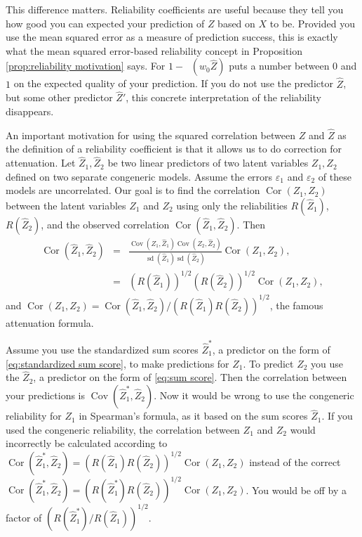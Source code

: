 \documentclass[twoside]{article}
\DeclareMathOperator{\sd}{sd}
\DeclareMathOperator{\Cor}{Cor}
\DeclareMathOperator{\Cov}{Cov}
\DeclareMathOperator{\MSE}{MSE_Z}
\renewcommand{\sqrt}[1]{{(#1)^{1/2}}}
\begin{document}
This difference matters. Reliability coefficients are useful because they tell you how good you can expected your prediction of $Z$ based on $X$ to be. Provided you use the mean squared error as a measure of prediction success, this is exactly what the mean squared error-based reliability concept in Proposition \ref{prop:reliability motivation} says. For $1 - \MSE(w_0\hat{Z})$ puts a number between $0$ and $1$ on the expected quality of your prediction. If you do not use the predictor $\hat{Z}$, but some other predictor $\hat{Z}'$, this concrete interpretation of the reliability disappears. 

An important motivation for using the squared
correlation between $Z$ and $\hat{Z}$ as the definition of a
reliability coefficient is that it allows us to do correction for
attenuation. Let $\hat{Z}_{1},\hat{Z}_{2}$ be two linear
predictors of two latent variables $Z_{1},Z_{2}$ defined on two separate
congeneric models. Assume the errors $\varepsilon_{1}$ and $\varepsilon_{2}$ of these models
are uncorrelated. Our goal is to find the correlation $\Cor(Z_{1},Z_{2})$
between the latent variables $Z_{1}$ and $Z_{2}$ using only the
reliabilities $ R(\hat{Z}_{1})$, $ R(\hat{Z}_{2})$,
and the observed correlation $\Cor(\hat{Z}_{1},\hat{Z}_{2})$.
Then
\begin{eqnarray*}
\Cor(\hat{Z}_{1},\hat{Z}_{2}) & = & \frac{\Cov(Z_{1},\hat{Z}_{1})\Cov(Z_{2},\hat{Z}_{2})}{\sd(\hat{Z}_{1})\sd(\hat{Z}_{2})}\Cor(Z_{1},Z_{2}),\\
 & = & \sqrt{ R(\hat{Z}_{1})}\sqrt{ R(\hat{Z}_{2})}\Cor(Z_{1},Z_{2}),
\end{eqnarray*}
and $\Cor(Z_{1},Z_{2})=\Cor(\hat{Z}_{1},\hat{Z}_{2})/\sqrt{ R(\hat{Z}_{1}) R(\hat{Z}_{2})}$,
the famous \citet{spearman1904proof} attenuation formula.


Assume you use the standardized sum scores $\hat{Z}_1^*$, a predictor on the form of  \cref{eq:standardized sum score}, to make predictions for $Z_1$. To predict $Z_2$ you use the $\hat{Z}_2$, a predictor on the form of \cref{eq:sum score}. Then the correlation between your predictions is $\Cov(\hat{Z}_1^*,\hat{Z}_2)$. Now it would be wrong to use the congeneric reliability for $Z_1$ in Spearman's formula, as it based on the sum scores $\hat{Z}_1$. If you used the congeneric reliability, the correlation between $Z_1$ and $Z_2$ would incorrectly be calculated according to $\Cor(\hat{Z}_{1}^*,\hat{Z}_{2})= \sqrt{ R(\hat{Z}_{1}) R(\hat{Z}_{2})}\Cor(Z_{1},Z_{2})$
instead of the correct $\Cor(\hat{Z}_{1}^*,\hat{Z}_{2})=\sqrt{ R(\hat{Z}_{1}^{*}) R(\hat{Z}_{2})}\Cor(Z_{1},Z_{2})$.
You would be off by a factor of $\sqrt{ R(\hat{Z}_{1}^{*})/ R(\hat{Z}_{1})}$.
\end{document}

